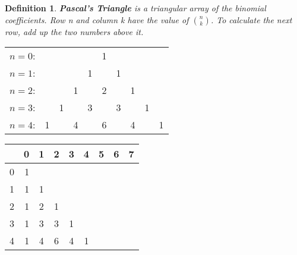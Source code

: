 \documentclass{article}
\newtheorem{defn}{Definition}
\begin{document}
\begin{defn}
\textbf{Pascal's Triangle}  is a triangular array of the binomial coefficients. Row n and column k have the value of ${n \choose k}$. To calculate the next row, add up the two numbers above it.
\end{defn}

\begin{multicols}{2}
\begin{tabular}{rccccccccc}
$n=0$: & & & & & 1 & & & & \\
$n=1$: & & & & 1 & & 1 & & & \\
$n=2$: & & & 1 & & 2 & & 1 & & \\
$n=3$: & & 1 & & 3 & & 3 & & 1 & \\
$n=4$: & 1 & & 4 & & 6 & & 4 & & 1%
\end{tabular}

\begin{tabular}{r|r|c|c|c|c|c|c|c}
& 0 & 1 & 2 & 3 & 4 & 5 & 6 & 7\\
\hline
0 & 1 & & & & & & &\\
\hline
1 & 1 & 1 & & & & & &\\
\hline
2 & 1 & 2 & 1 & & & & &\\
\hline
3 & 1 & 3 & 3 & 1 & & & &\\
\hline
4 & 1 & 4 & 6 & 4 & 1 & & &%
\end{tabular}

\end{multicols}
\end{document}

